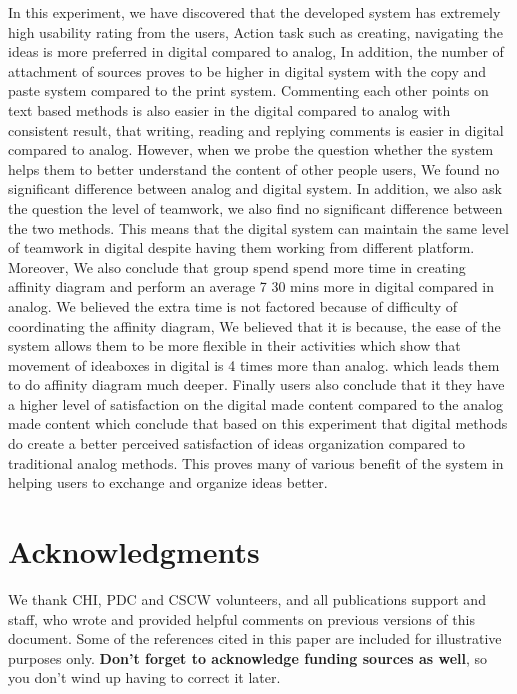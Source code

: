\documentclass{sigchi}
\begin{document}
\begin{itemize}
\begin{itemize}
In this experiment, we have discovered that the developed system has extremely high usability rating from the users, Action task such as creating, navigating the ideas is more preferred  in digital compared to analog, In addition, the number of attachment of sources proves to be higher in digital system with the copy and paste system compared to the print system. Commenting each other points on text based methods is also easier in the digital compared to analog with consistent result, that writing, reading and replying comments is easier in digital compared to analog.  However, when we probe the question whether the system helps them to better understand the content of other people users, We found no significant difference between analog and digital system. In addition, we also ask the question the level of teamwork, we also find no significant difference between the two methods. This means that the digital system can maintain the same level of teamwork in digital despite having  them working from different platform. Moreover, We also conclude that group spend spend more time in creating affinity diagram and perform an average  7 30 mins more in digital compared in analog. We believed the extra time is not factored because of difficulty of coordinating the affinity diagram, We believed that it is because, the ease of the system allows them to be more flexible in their activities which show that  movement of ideaboxes in digital is 4 times more than analog. which leads them to do affinity diagram much deeper. Finally users also conclude that it they have a higher level of satisfaction on the digital made content compared to the analog made content which conclude that based on this experiment that  digital methods do create a better perceived satisfaction of ideas organization compared to traditional analog methods. This proves many of various benefit of the system in helping users to exchange and organize ideas better. 


\section{Acknowledgments}

We thank CHI, PDC and CSCW volunteers, and all publications support
and staff, who wrote and provided helpful comments on previous
versions of this document.  Some of the references cited in this paper
are included for illustrative purposes only.  \textbf{Don't forget
to acknowledge funding sources as well}, so you don't wind up
having to correct it later.


\end{itemize}
\end{itemize}
\end{document}
